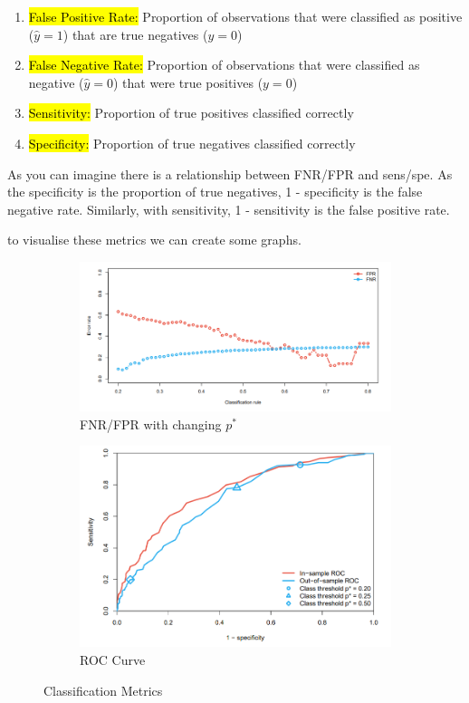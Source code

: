 \documentclass[11pt]{article}
\begin{document}
\begin{enumerate}
    \item \hl{False Positive Rate:} Proportion of observations that were classified as positive ($\hat{y} = 1$) that are true negatives ($y = 0$)
    \item \hl{False Negative Rate:} Proportion of observations that were classified as negative ($\hat{y} = 0$) that were true positives ($y=0$)
    \item \hl{Sensitivity:} Proportion of true positives classified correctly
    \item  \hl{Specificity:} Proportion of true negatives classified correctly
\end{enumerate}

As you can imagine there is a relationship between FNR/FPR and sens/spe. As the specificity is the proportion of true negatives, 1 - specificity is the false negative rate. Similarly, with sensitivity, 1 - sensitivity is the false positive rate.

to visualise these metrics we can create some graphs.


\begin{figure}[h]
\centering
\begin{subfigure}{.5\textwidth}
  \centering
  \includegraphics[width=\linewidth]{pic/error rates.png}
  \caption{FNR/FPR with changing $p^*$}
  \label{fig:3nn}
\end{subfigure}%
\begin{subfigure}{.5\textwidth}
  \centering
  \includegraphics[width=\linewidth]{pic/roc.png}
  \caption{ROC Curve}
  \label{fig:5nn}
\end{subfigure}
\caption{Classification Metrics}
\label{fig:classification metrics}
\end{figure}
\end{document}
